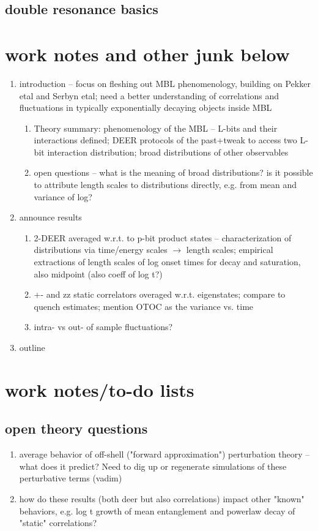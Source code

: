 \documentclass[aps,prb,twocolumn,showpacs,superscriptaddress,citeautoscript]{revtex4}  %
\begin{document}
\subsection{double resonance basics}



\section{work notes and other junk below}
\begin{enumerate}
\item introduction -- focus on fleshing out MBL phenomenology, building on Pekker etal and Serbyn etal; need a better understanding of correlations and fluctuations in typically exponentially decaying objects inside MBL
\begin{enumerate}
\item Theory summary: phenomenology of the MBL -- L-bits and their interactions defined; DEER protocols of the past+tweak to access two L-bit interaction distribution; broad distributions of other observables
\item open questions -- what is the meaning of broad distributions? is it possible to attribute length scales to distributions directly, e.g. from mean and variance of log?
\end{enumerate}
\item announce results
\begin{enumerate}
	\item 2-DEER averaged w.r.t. to p-bit product states -- characterization of distributions via time/energy scales $\to$ length scales; empirical extractions of length scales of log onset times for decay and saturation, also midpoint (also coeff of log t?)
	\item +- and zz static correlators overaged w.r.t. eigenstates; compare to quench estimates; mention OTOC as the variance vs. time
	\item intra- vs out- of sample fluctuations?
\end{enumerate}
\item outline
\end{enumerate}
\section{work notes/to-do lists}
\subsection{open theory questions}
\begin{enumerate}
	\item average behavior of off-shell ("forward approximation") perturbation theory -- what does it predict? Need to dig up or regenerate simulations of these perturbative terms (vadim)
	\item how do these results (both deer but also correlations) impact other "known" behaviors, e.g. log t growth of mean entanglement and powerlaw decay of "static" correlations?
\end{enumerate}
\end{document}
